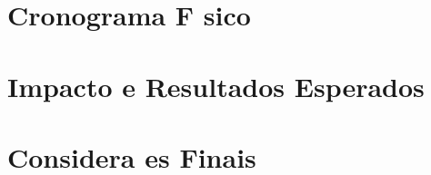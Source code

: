\documentclass{article}
\begin{document}
            \chapter{Cronograma F sico}\label{cap:cronograma}

            
            \chapter{Impacto e Resultados Esperados}\label{cap:impacto}

          
            \chapter{Considera es Finais}\label{cap:conclusao}


          \pagestyle{inovapre}
        
            
            
        




                

                

          
            

\end{document}
